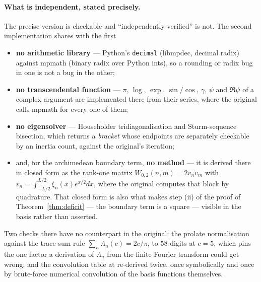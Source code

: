 \documentclass[11pt,a4paper]{article}
\theoremstyle{plain}
\theoremstyle{definition}
\theoremstyle{remark}
\newcommand{\file}[1]{\path{#1}}
\begin{document}
\paragraph{What is independent, stated precisely.}  The precise version is
checkable and ``independently verified'' is not.  The second implementation
shares with the first
\begin{itemize}\itemsep1pt
\item \textbf{no arithmetic library} --- Python's \texttt{decimal} (libmpdec,
decimal radix) against mpmath (binary radix over Python ints), so a rounding or
radix bug in one is not a bug in the other;
\item \textbf{no transcendental function} --- $\pi$, $\log$, $\exp$,
$\sin/\cos$, $\gamma$, $\psi$ and $\Re\psi$ of a complex argument are
implemented there from their series, where the original calls mpmath for every
one of them;
\item \textbf{no eigensolver} --- Householder tridiagonalisation and
Sturm-sequence bisection, which returns a \emph{bracket} whose endpoints are
separately checkable by an inertia count, against the original's iteration;
\item and, for the archimedean boundary term, \textbf{no method} --- it is
derived there in closed form as the rank-one matrix $W_{0,2}(n,m)=2v_nv_m$ with
$v_n=\int_{-L/2}^{L/2}\xi_n(x)e^{x/2}dx$, where the original computes that block
by quadrature.  That closed form is also what makes step (ii) of the proof of
Theorem~\ref{thm:deficit} --- the boundary term is a square --- visible in the
basis rather than asserted.
\end{itemize}
Two checks there have no counterpart in the original: the prolate normalisation
against the trace sum rule $\sum_n\Lambda_n(c)=2c/\pi$, to $58$ digits at $c=5$,
which pins the one factor a derivation of $\Lambda_n$ from the finite Fourier
transform could get wrong; and the convolution table at \file{:444} re-derived
twice, once symbolically and once by brute-force numerical convolution of the
basis functions themselves.
\end{document}
